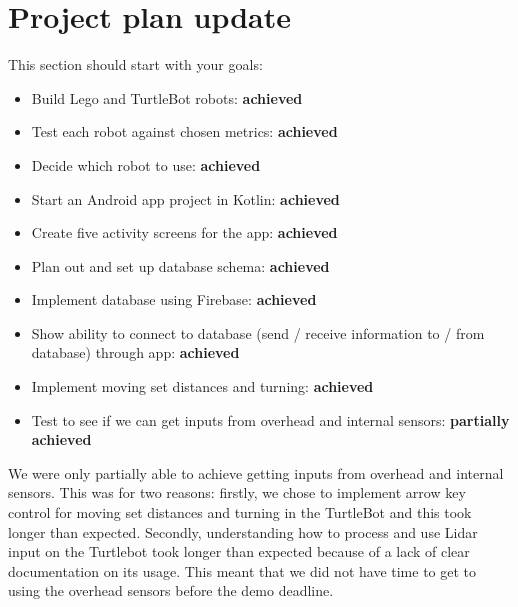 \documentclass{article}
\begin{document}
 



\begin{abstract}
  {\it Tadashi} is an assistive robot to automate simple tasks within a healthcare environment: waking patients up, bringing food and water to patients at specified times, and checking on the welfare of patients when needed.
  In this demo we will demonstrate remote control of movement and turning for the TurtleBot; as well as the ability to recognize objects in its path using the built-in Lidar sensor. We will demonstrate the Lego robot we built, although after testing we have decided to proceed with the TurtleBot. We will also demonstrate a skeleton Android app allowing for basic interaction with a database. 
\end{abstract} 

\section{Project plan update} 

This section should start with your goals:
\begin{itemize}
\item Build Lego and TurtleBot robots: {\bf achieved}
\item Test each robot against chosen metrics: {\bf achieved}
\item Decide which robot to use: {\bf achieved}
\item Start an Android app project in Kotlin: {\bf achieved}
\item Create five activity screens for the app: {\bf achieved}
\item Plan out and set up database schema: {\bf achieved}
\item Implement database using Firebase: {\bf achieved}
\item Show ability to connect to database (send / receive information to / from database) through app: {\bf achieved}
\item Implement moving set distances and turning: {\bf achieved}
\item Test to see if we can get inputs from overhead and internal sensors: {\bf partially achieved}
\end{itemize}

We were only partially able to achieve getting inputs from overhead and internal sensors. This was for two reasons: firstly, we chose to implement arrow key control for moving set distances and turning in the TurtleBot and this took longer than expected. Secondly, understanding how to process and use Lidar input on the Turtlebot took longer than expected because of a lack of clear documentation on its usage. This meant that we did not have time to get to using the overhead sensors before the demo deadline. 
\end{document}
